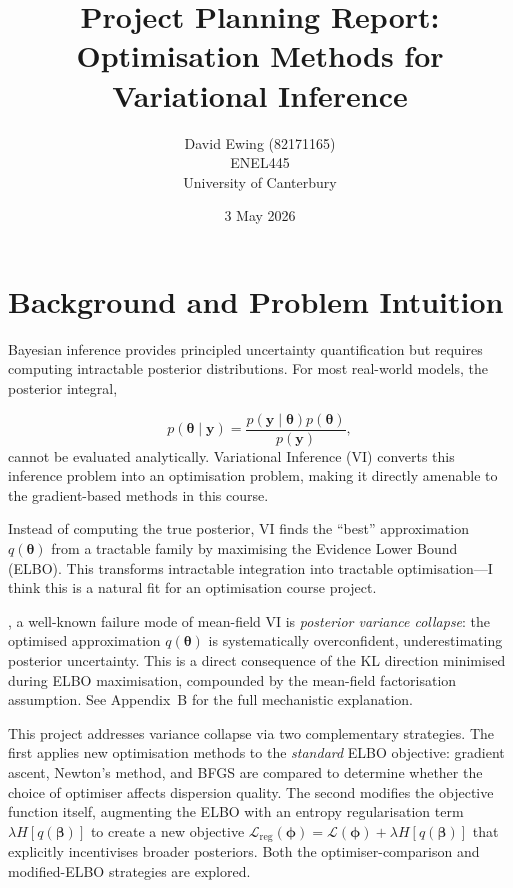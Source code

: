 \documentclass[11pt]{article}
\title{Project Planning Report:\\
Optimisation Methods for Variational Inference}
\author{David Ewing (82171165)\\
ENEL445  \\
University of Canterbury}
\date{3 May 2026}
\begin{document}
\maketitle

\section*{Background and Problem Intuition}

Bayesian inference provides principled uncertainty quantification but requires computing intractable posterior distributions. For most real-world models, the posterior integral,

\begin{equation*}
    p(\bm{\theta} \mid \bm{y}) = \frac{p(\bm{y} \mid \bm{\theta})p(\bm{\theta})}{p(\bm{y})},
\end{equation*}
\noindent 
cannot be evaluated analytically. Variational Inference (VI) converts this inference problem into an optimisation problem, making it directly amenable to the gradient-based methods in this course. \vspace{2em}

Instead of computing the true posterior, VI finds the ``best'' approximation $q(\bm{\theta})$ from a tractable family by maximising the Evidence Lower Bound (ELBO). This transforms intractable integration into tractable optimisation---I think this is a natural fit for an optimisation course project.

\vspace{2em} , a well-known failure mode of mean-field VI is \emph{posterior variance collapse}: the optimised approximation $q(\bm{\theta})$ is systematically overconfident, underestimating posterior uncertainty. This is a direct consequence of the KL direction minimised during ELBO maximisation, compounded by the mean-field factorisation assumption. See Appendix~B for the full mechanistic explanation.

This project addresses variance collapse via two complementary strategies. The first applies new optimisation methods to the \emph{standard} ELBO objective: gradient ascent, Newton's method, and BFGS are compared to determine whether the choice of optimiser affects dispersion quality. The second modifies the objective function itself, augmenting the ELBO with an entropy regularisation term $\lambda H[q(\bm{\beta})]$ to create a new objective $\mathcal{L}_{\mathrm{reg}}(\bm{\phi}) = \mathcal{L}(\bm{\phi}) + \lambda H[q(\bm{\beta})]$ that explicitly incentivises broader posteriors. Both the optimiser-comparison and modified-ELBO strategies are explored.
\end{document}

